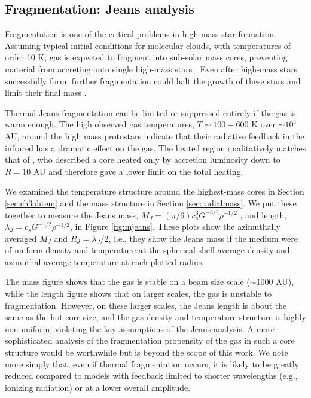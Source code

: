 \documentclass{emulateapj}
\begin{document}
\subsection{Fragmentation: Jeans analysis}
\label{sec:fragmentation}
Fragmentation is one of the critical problems in high-mass star formation.
Assuming typical initial conditions for molecular clouds, with temperatures of
order 10 K, gas is expected to fragment into sub-solar mass cores, preventing
material from accreting onto single high-mass stars \citep{Krumholz2015a}.
Even after high-mass stars successfully form, further fragmentation could
halt the growth of these stars and limit their final mass \citep{Peters2010a}.

Thermal Jeans fragmentation can be limited or suppressed entirely if the gas is
warm enough.  The high observed gas temperatures, $T\sim100-600$ K over
$\sim10^4$ AU, around the high mass protostars indicate that their radiative
feedback in the infrared has a dramatic effect on the gas.  The heated region
qualitatively matches that of \citet{Krumholz2006a}, who described
a core heated only by accretion luminosity down to $R=10$ AU and therefore
gave a lower limit on the total heating. 

We examined the temperature structure around the highest-mass cores in Section
\ref{sec:ch3ohtem} and the mass structure in Section \ref{sec:radialmass}.  We
put these together to measure the Jeans mass, $M_J = (\pi / 6) c_s^3
G^{-3/2} \rho^{-1/2}$
, and length, $\lambda_J = c_s G^{-1/2} \rho^{-1/2}$, 
in
Figure \ref{fig:mjeans}.  These plots show the azimuthally averaged $M_J$
and $R_J=\lambda_J/2$,
i.e., they show the Jeans mass if the medium
were of uniform density and temperature at the spherical-shell-average density
and azimuthal average temperature at each plotted radius.

The mass figure shows that the gas is stable on a beam size scale ($\sim1000$ AU),
while the length figure shows that on larger scales, the gas is unstable to
fragmentation.  However, on these larger scales, the Jeans length is about
the same as the hot core size, and the gas density and temperature structure is
highly non-uniform, violating the key assumptions of the Jeans analysis.  
A more sophisticated analysis of the fragmentation propensity of the gas
in such a core structure would be worthwhile but is beyond the scope of
this work.  We note more simply that, even if thermal fragmentation occurs, it
is likely to be greatly reduced compared to models with feedback limited to
shorter wavelengths (e.g., ionizing radiation) or at a lower overall amplitude.
\end{document}

